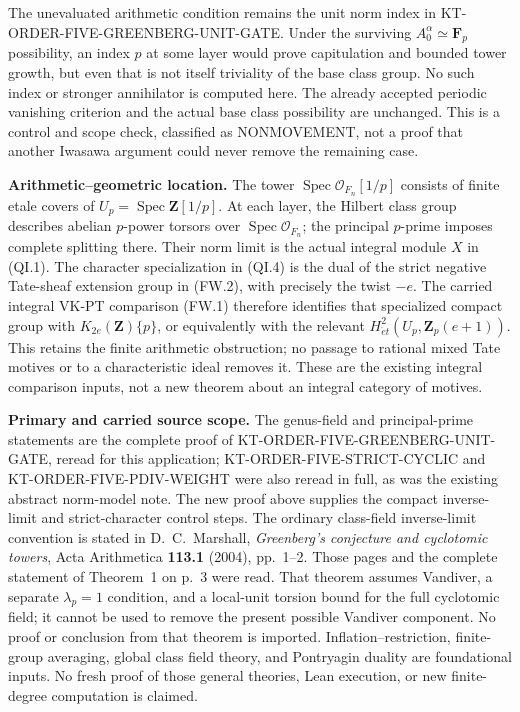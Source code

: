 \documentclass[11pt,a4paper]{article}
\theoremstyle{definition}
\renewcommand{\paragraph}[1]{\par\smallskip\noindent\textbf{#1}\quad\ignorespaces}
\begin{document}
The unevaluated arithmetic condition remains the unit norm index
in KT-ORDER-FIVE-GREENBERG-UNIT-GATE.  Under the surviving
$A_0^\alpha\simeq\mathbf F_p$ possibility, an index $p$ at some
layer would prove capitulation and bounded tower growth, but even
that is not itself triviality of the base class group.  No such
index or stronger annihilator is computed here.  The already
accepted periodic vanishing criterion and the actual base class
possibility are unchanged.  This is a control and scope check,
classified as NONMOVEMENT, not a proof that another Iwasawa
argument could never remove the remaining case.

\paragraph{Arithmetic--geometric location.}
The tower $\operatorname{Spec}\mathcal O_{F_n}[1/p]$ consists
of finite etale covers of $U_p=\operatorname{Spec}\mathbf Z[1/p]$.
At each layer, the Hilbert class group describes abelian
$p$-power torsors over $\operatorname{Spec}\mathcal O_{F_n}$;
the principal $p$-prime imposes complete splitting there.
Their norm limit is the actual integral module $X$ in (QI.1).
The character specialization in (QI.4) is the dual of the strict
negative Tate-sheaf extension group in (FW.2), with precisely
the twist $-e$.  The carried integral VK-PT comparison (FW.1)
therefore identifies that specialized compact group with
$K_{2e}(\mathbf Z)\{p\}$, or equivalently with the relevant
$H^2_{\acute et}(U_p,\mathbf Z_p(e+1))$.
This retains the finite arithmetic obstruction; no passage to
rational mixed Tate motives or to a characteristic ideal
removes it.  These are the existing integral comparison inputs,
not a new theorem about an integral category of motives.

\paragraph{Primary and carried source scope.}
The genus-field and principal-prime statements are the complete
proof of KT-ORDER-FIVE-GREENBERG-UNIT-GATE, reread for this
application; KT-ORDER-FIVE-STRICT-CYCLIC and
KT-ORDER-FIVE-PDIV-WEIGHT were also reread in full, as was the
existing abstract norm-model note.  The new proof above supplies
the compact inverse-limit and strict-character control steps.
The ordinary class-field inverse-limit convention is stated in
D.~C.~Marshall, \emph{Greenberg's conjecture and cyclotomic towers},
Acta Arithmetica \textbf{113.1} (2004), pp.~1--2.
Those pages and the complete statement of Theorem~1 on p.~3 were
read.  That theorem assumes Vandiver, a separate $\lambda_p=1$
condition, and a local-unit torsion bound for the full cyclotomic
field; it cannot be used to remove the present possible Vandiver
component.  No proof or conclusion from that theorem is imported.
Inflation--restriction, finite-group averaging, global class
field theory, and Pontryagin duality are foundational inputs.
No fresh proof of those general theories, Lean execution, or
new finite-degree computation is claimed.
\end{document}
